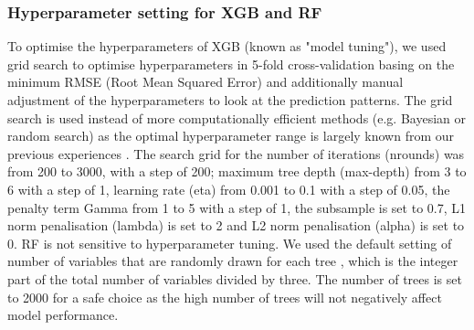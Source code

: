 \documentclass{article}
\begin{document}
\subsubsection{Hyperparameter setting for XGB and RF}
\label{sec:hp}

To optimise the hyperparameters of XGB (known as "model tuning"), we used grid search to optimise hyperparameters in 5-fold cross-validation basing on the minimum RMSE (Root Mean Squared Error) and additionally manual adjustment of the hyperparameters to look at the prediction patterns. The grid search is used instead of more computationally efficient methods (e.g. Bayesian or random search) as the optimal hyperparameter range is largely known from our previous experiences \citep{luglobal,nijmegen}. The search grid for the number of iterations (nrounds) was from 200 to 3000, with a step of 200; maximum tree depth (max-depth) from 3 to 6 with a step of 1, learning rate (eta) from 0.001 to 0.1 with a step of 0.05, the penalty term Gamma \citep{xgboost} from 1 to 5 with a step of 1, the subsample is set to 0.7, L1 norm penalisation (lambda) is set to 2 and L2 norm penalisation (alpha) is set to 0. %
RF is not sensitive to hyperparameter tuning. We used the default setting of number of variables that are randomly drawn for each tree \citep{breiman2001random}, which is the integer part of the total number of variables divided by three. The number of trees is set to 2000 for a safe choice as the high number of trees will not negatively affect model performance. 



\end{document}
